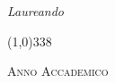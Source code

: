 \begin{titlepage}
\begin{center}
\begin{large}
			\vspace{0pt}
		
			\begin{flushright}
				\textit{Laureando}\\
				\vspace{5pt}
				\autore
			\end{flushright}
		
		\end{large}
	
		\vspace{40pt}
		\line(1,0){338} \\

		\begin{normalsize}
			\textsc{Anno Accademico \myAA}
		\end{normalsize}

	\end{center}

\end{titlepage}